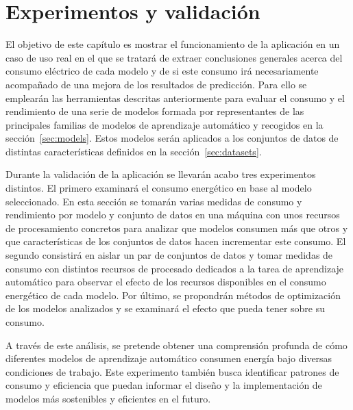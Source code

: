 \chapter{Experimentos y validación}
\label{chap:experimentos}

El objetivo de este capítulo es mostrar el funcionamiento de la aplicación en un caso de uso real en el que se tratará de extraer conclusiones generales acerca del consumo eléctrico de cada modelo y de si este consumo irá necesariamente acompañado de una mejora de los resultados de predicción.
Para ello se emplearán las herramientas descritas anteriormente para evaluar el consumo y el rendimiento de una serie de modelos formada por representantes de las principales familias de modelos de aprendizaje automático y recogidos en la sección~\ref{sec:models}. Estos modelos serán aplicados a los conjuntos de datos de distintas características definidos en la sección~\ref{sec:datasets}.

Durante la validación de la aplicación se llevarán acabo tres experimentos distintos.
El primero examinará el consumo energético en base al modelo seleccionado. En esta sección se tomarán varias medidas de consumo y rendimiento por modelo y conjunto de datos en una máquina con unos recursos de procesamiento concretos para analizar que modelos consumen más que otros y que características de los conjuntos de datos hacen incrementar este consumo.
El segundo consistirá en aislar un par de conjuntos de datos y tomar medidas de consumo con distintos recursos de procesado dedicados a la tarea de aprendizaje automático para observar el efecto de los recursos disponibles en el consumo energético de cada modelo.
Por último, se propondrán métodos de optimización de los modelos analizados y se examinará el efecto que pueda tener sobre su consumo. 

A través de este análisis, se pretende obtener una comprensión profunda de cómo diferentes modelos de aprendizaje automático consumen energía bajo diversas condiciones de trabajo. Este experimento también busca identificar patrones de consumo y eficiencia que puedan informar el diseño y la implementación de modelos más sostenibles y eficientes en el futuro.



